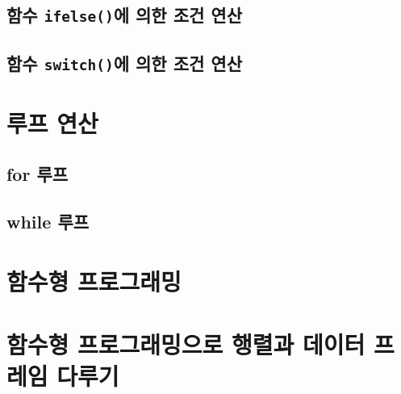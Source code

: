 \documentclass[
]{book}
\begin{document}
\hypertarget{uxd568uxc218-ifelseuxc5d0-uxc758uxd55c-uxc870uxac74-uxc5f0uxc0b0}{%
\subsection{\texorpdfstring{함수 \texttt{ifelse()}에 의한 조건 연산}{함수 ifelse()에 의한 조건 연산}}\label{uxd568uxc218-ifelseuxc5d0-uxc758uxd55c-uxc870uxac74-uxc5f0uxc0b0}}

\hypertarget{uxd568uxc218-switchuxc5d0-uxc758uxd55c-uxc870uxac74-uxc5f0uxc0b0}{%
\subsection{\texorpdfstring{함수 \texttt{switch()}에 의한 조건 연산}{함수 switch()에 의한 조건 연산}}\label{uxd568uxc218-switchuxc5d0-uxc758uxd55c-uxc870uxac74-uxc5f0uxc0b0}}

\hypertarget{uxb8e8uxd504-uxc5f0uxc0b0}{%
\section{루프 연산}\label{uxb8e8uxd504-uxc5f0uxc0b0}}

\hypertarget{for-uxb8e8uxd504}{%
\subsection{for 루프}\label{for-uxb8e8uxd504}}

\hypertarget{while-uxb8e8uxd504}{%
\subsection{while 루프}\label{while-uxb8e8uxd504}}

\hypertarget{uxd568uxc218uxd615-uxd504uxb85cuxadf8uxb798uxbc0d}{%
\section{함수형 프로그래밍}\label{uxd568uxc218uxd615-uxd504uxb85cuxadf8uxb798uxbc0d}}

\hypertarget{uxd568uxc218uxd615-uxd504uxb85cuxadf8uxb798uxbc0duxc73cuxb85c-uxd589uxb82cuxacfc-uxb370uxc774uxd130-uxd504uxb808uxc784-uxb2e4uxb8e8uxae30}{%
\section{함수형 프로그래밍으로 행렬과 데이터 프레임 다루기}\label{uxd568uxc218uxd615-uxd504uxb85cuxadf8uxb798uxbc0duxc73cuxb85c-uxd589uxb82cuxacfc-uxb370uxc774uxd130-uxd504uxb808uxc784-uxb2e4uxb8e8uxae30}}
\end{document}
